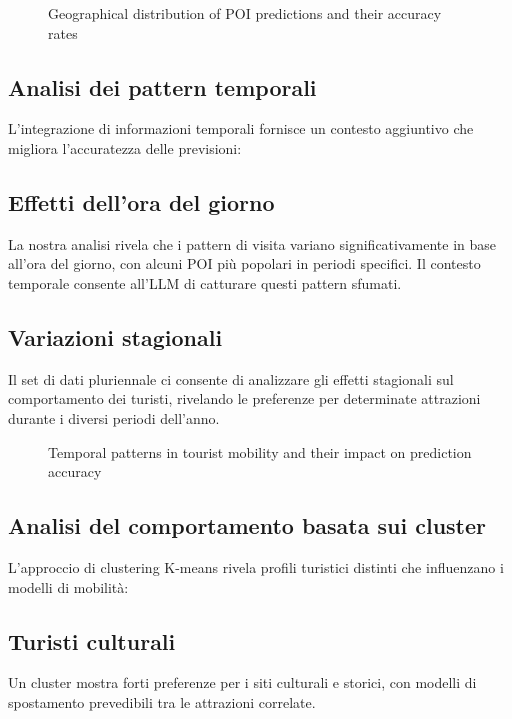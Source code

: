 \documentclass[12pt,a4paper]{article}
\begin{document}
\begin{figure}[H]
\centering
\caption{Geographical distribution of POI predictions and their accuracy rates}
\label{fig:geographical_analysis}
\end{figure}

\subsection{Analisi dei pattern temporali}

L'integrazione di informazioni temporali fornisce un contesto aggiuntivo che migliora l'accuratezza delle previsioni:

\subsection{Effetti dell'ora del giorno}
La nostra analisi rivela che i pattern di visita variano significativamente in base all'ora del giorno, con alcuni POI più popolari in periodi specifici. Il contesto temporale consente all'LLM di catturare questi pattern sfumati.

\subsection{Variazioni stagionali}
Il set di dati pluriennale ci consente di analizzare gli effetti stagionali sul comportamento dei turisti, rivelando le preferenze per determinate attrazioni durante i diversi periodi dell'anno.

\begin{figure}[H]
\centering
\caption{Temporal patterns in tourist mobility and their impact on prediction accuracy}
\label{fig:temporal_analysis}
\end{figure}

\subsection{Analisi del comportamento basata sui cluster}

L'approccio di clustering K-means rivela profili turistici distinti che influenzano i modelli di mobilità:

\subsection{Turisti culturali}
Un cluster mostra forti preferenze per i siti culturali e storici, con modelli di spostamento prevedibili tra le attrazioni correlate.
\end{document}
